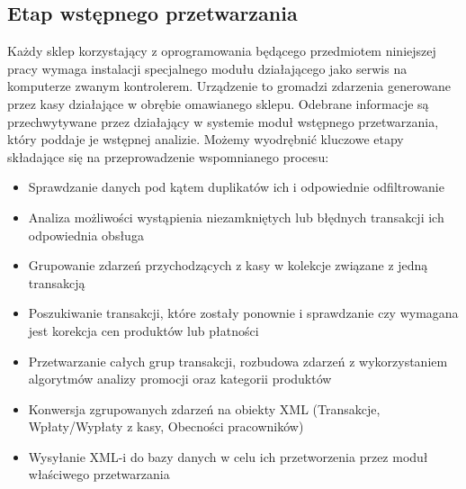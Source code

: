 \documentclass[a4paper]{book}
\begin{document}
\subsection{Etap wstępnego przetwarzania}
Każdy sklep korzystający z oprogramowania będącego przedmiotem niniejszej pracy wymaga instalacji specjalnego modułu działającego jako serwis na komputerze zwanym kontrolerem. Urządzenie to gromadzi zdarzenia generowane przez kasy działające w obrębie omawianego sklepu. Odebrane informacje są przechwytywane przez działający w systemie moduł wstępnego przetwarzania, który poddaje je wstępnej analizie. Możemy wyodrębnić kluczowe etapy składające się na przeprowadzenie wspomnianego procesu:
\begin{itemize}
	\item Sprawdzanie danych pod kątem duplikatów ich i odpowiednie odfiltrowanie
	\item Analiza możliwości wystąpienia niezamkniętych lub błędnych transakcji ich odpowiednia obsługa
	\item Grupowanie zdarzeń przychodzących z kasy w kolekcje związane z jedną transakcją
	\item Poszukiwanie transakcji, które zostały ponownie i sprawdzanie czy wymagana jest korekcja cen produktów lub płatności
	\item Przetwarzanie całych grup transakcji, rozbudowa zdarzeń z wykorzystaniem algorytmów analizy promocji oraz kategorii produktów
	\item Konwersja zgrupowanych zdarzeń na obiekty XML (Transakcje, Wpłaty/Wypłaty z kasy, Obecności pracowników)
	\item Wysyłanie XML-i do bazy danych w celu ich przetworzenia przez moduł właściwego przetwarzania
\end{itemize}
\end{document}
